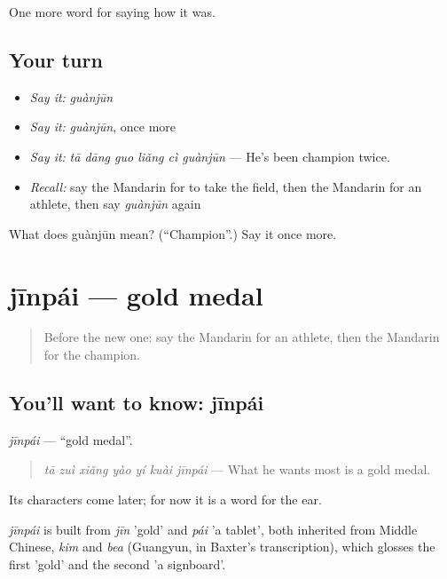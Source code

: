 \begin{grammarlens}[title={What you've built}]
One more word for saying how it was.
\end{grammarlens}

\subsection*{Your turn}
\begin{itemize}
\raggedright
  \item \emph{Say it:} \emph{guànjūn}
  \item \emph{Say it:} \emph{guànjūn}, once more
  \item \emph{Say it:} \emph{tā dāng guo liǎng cì guànjūn} — He's been champion twice.
  \item \emph{Recall:} say the Mandarin for to take the field, then the Mandarin for an athlete, then say \emph{guànjūn} again
\end{itemize}

\begin{tcolorbox}[breakable,colback=teal!4,colframe=teal!35!black,title={Before you move on}]
What does guànjūn mean? (\textquotedblleft{}Champion\textquotedblright{}.) Say it once more.
\end{tcolorbox}
\section[jīnpái]{jīnpái — gold medal}

\label{lesson:ZH-C501-jinpai}



\begin{quote}
Before the new one: say the Mandarin for an athlete, then the Mandarin for the champion.
\end{quote}

\subsection*{You'll want to know: jīnpái}
\emph{jīnpái} — \textquotedblleft{}gold medal\textquotedblright{}.

\begin{quote}
\emph{tā zuì xiǎng yào yí kuài jīnpái} — What he wants most is a gold medal.
\end{quote}

Its characters come later; for now it is a word for the ear.

\begin{cousinweb}
\emph{jīnpái} is built from \emph{jīn} 'gold' and \emph{pái} 'a tablet', both inherited from Middle Chinese, \emph{kim} and \emph{bea} (Guangyun, in Baxter's transcription), which glosses the first 'gold' and the second 'a signboard'.
\end{cousinweb}

